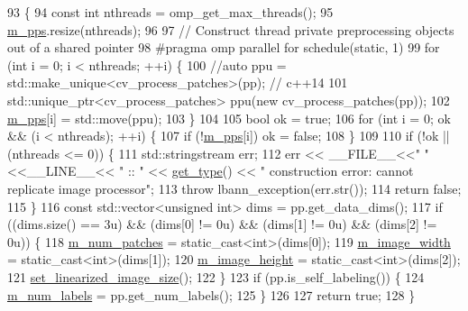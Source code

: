\begin{DoxyCode}
93                                                                               \{
94   \textcolor{keyword}{const} \textcolor{keywordtype}{int} nthreads = omp\_get\_max\_threads();
95   \hyperlink{classlbann_1_1imagenet__reader__patches_a76a4c760b0430ce6df990b9e3bd33fef}{m\_pps}.resize(nthreads);
96 
97   \textcolor{comment}{// Construct thread private preprocessing objects out of a shared pointer}
98 \textcolor{preprocessor}{  #pragma omp parallel for schedule(static, 1)}
99   \textcolor{keywordflow}{for} (\textcolor{keywordtype}{int} i = 0; i < nthreads; ++i) \{
100     \textcolor{comment}{//auto ppu = std::make\_unique<cv\_process\_patches>(pp); // c++14}
101     std::unique\_ptr<cv\_process\_patches> ppu(\textcolor{keyword}{new} cv\_process\_patches(pp));
102     \hyperlink{classlbann_1_1imagenet__reader__patches_a76a4c760b0430ce6df990b9e3bd33fef}{m\_pps}[i] = std::move(ppu);
103   \}
104 
105   \textcolor{keywordtype}{bool} ok = \textcolor{keyword}{true};
106   \textcolor{keywordflow}{for} (\textcolor{keywordtype}{int} i = 0; ok && (i < nthreads); ++i) \{
107     \textcolor{keywordflow}{if} (!\hyperlink{classlbann_1_1imagenet__reader__patches_a76a4c760b0430ce6df990b9e3bd33fef}{m\_pps}[i]) ok = \textcolor{keyword}{false};
108   \}
109 
110   \textcolor{keywordflow}{if} (!ok || (nthreads <= 0)) \{
111     std::stringstream err;
112     err << \_\_FILE\_\_<<\textcolor{stringliteral}{" "}<<\_\_LINE\_\_<< \textcolor{stringliteral}{" :: "} << \hyperlink{classlbann_1_1imagenet__reader__patches_adc6363b20f058260c674d92af2a6ef80}{get\_type}() << \textcolor{stringliteral}{" construction error: cannot replicate
       image processor"};
113     \textcolor{keywordflow}{throw} lbann\_exception(err.str());
114     \textcolor{keywordflow}{return} \textcolor{keyword}{false};
115   \}
116   \textcolor{keyword}{const} std::vector<unsigned int> dims = pp.get\_data\_dims();
117   \textcolor{keywordflow}{if} ((dims.size() == 3u) && (dims[0] != 0u) && (dims[1] != 0u) && (dims[2] != 0u)) \{
118     \hyperlink{classlbann_1_1imagenet__reader__patches_a3380936d3d01d5efc77f0f129891fc65}{m\_num\_patches} = \textcolor{keyword}{static\_cast<}\textcolor{keywordtype}{int}\textcolor{keyword}{>}(dims[0]);
119     \hyperlink{classlbann_1_1image__data__reader_af001f3d1c0f1c580b66988233b3a64f0}{m\_image\_width} = \textcolor{keyword}{static\_cast<}\textcolor{keywordtype}{int}\textcolor{keyword}{>}(dims[1]);
120     \hyperlink{classlbann_1_1image__data__reader_a0632efa3deaa9d61e671f741909eb3fe}{m\_image\_height} = \textcolor{keyword}{static\_cast<}\textcolor{keywordtype}{int}\textcolor{keyword}{>}(dims[2]);
121     \hyperlink{classlbann_1_1image__data__reader_a0164b0e3abbe92daef73b36fb925403e}{set\_linearized\_image\_size}();
122   \}
123   \textcolor{keywordflow}{if} (pp.is\_self\_labeling()) \{
124     \hyperlink{classlbann_1_1image__data__reader_af280e8758a6ec3acee7c62e6351d17e0}{m\_num\_labels} = pp.get\_num\_labels();
125   \}
126 
127   \textcolor{keywordflow}{return} \textcolor{keyword}{true};
128 \}
\end{DoxyCode}
